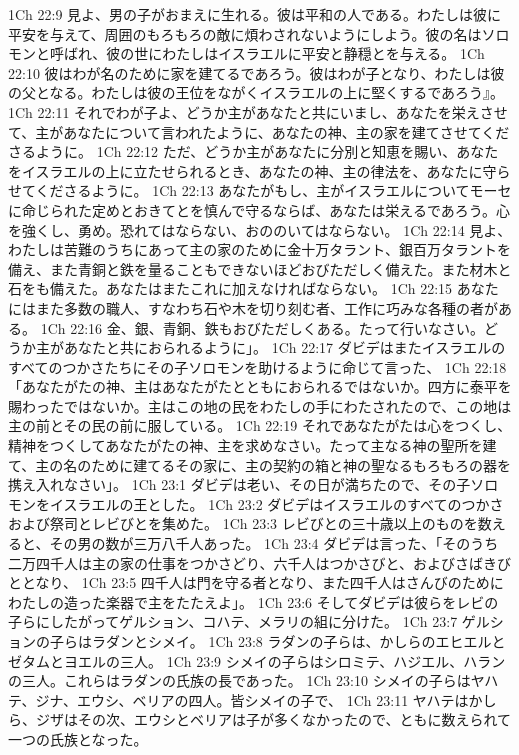1Ch 22:9  見よ、男の子がおまえに生れる。彼は平和の人である。わたしは彼に平安を与えて、周囲のもろもろの敵に煩わされないようにしよう。彼の名はソロモンと呼ばれ、彼の世にわたしはイスラエルに平安と静穏とを与える。
1Ch 22:10  彼はわが名のために家を建てるであろう。彼はわが子となり、わたしは彼の父となる。わたしは彼の王位をながくイスラエルの上に堅くするであろう』。
1Ch 22:11  それでわが子よ、どうか主があなたと共にいまし、あなたを栄えさせて、主があなたについて言われたように、あなたの神、主の家を建てさせてくださるように。
1Ch 22:12  ただ、どうか主があなたに分別と知恵を賜い、あなたをイスラエルの上に立たせられるとき、あなたの神、主の律法を、あなたに守らせてくださるように。
1Ch 22:13  あなたがもし、主がイスラエルについてモーセに命じられた定めとおきてとを慎んで守るならば、あなたは栄えるであろう。心を強くし、勇め。恐れてはならない、おののいてはならない。
1Ch 22:14  見よ、わたしは苦難のうちにあって主の家のために金十万タラント、銀百万タラントを備え、また青銅と鉄を量ることもできないほどおびただしく備えた。また材木と石をも備えた。あなたはまたこれに加えなければならない。
1Ch 22:15  あなたにはまた多数の職人、すなわち石や木を切り刻む者、工作に巧みな各種の者がある。
1Ch 22:16  金、銀、青銅、鉄もおびただしくある。たって行いなさい。どうか主があなたと共におられるように」。
1Ch 22:17  ダビデはまたイスラエルのすべてのつかさたちにその子ソロモンを助けるように命じて言った、
1Ch 22:18  「あなたがたの神、主はあなたがたとともにおられるではないか。四方に泰平を賜わったではないか。主はこの地の民をわたしの手にわたされたので、この地は主の前とその民の前に服している。
1Ch 22:19  それであなたがたは心をつくし、精神をつくしてあなたがたの神、主を求めなさい。たって主なる神の聖所を建て、主の名のために建てるその家に、主の契約の箱と神の聖なるもろもろの器を携え入れなさい」。
1Ch 23:1  ダビデは老い、その日が満ちたので、その子ソロモンをイスラエルの王とした。
1Ch 23:2  ダビデはイスラエルのすべてのつかさおよび祭司とレビびとを集めた。
1Ch 23:3  レビびとの三十歳以上のものを数えると、その男の数が三万八千人あった。
1Ch 23:4  ダビデは言った、「そのうち二万四千人は主の家の仕事をつかさどり、六千人はつかさびと、およびさばきびととなり、
1Ch 23:5  四千人は門を守る者となり、また四千人はさんびのためにわたしの造った楽器で主をたたえよ」。
1Ch 23:6  そしてダビデは彼らをレビの子らにしたがってゲルション、コハテ、メラリの組に分けた。
1Ch 23:7  ゲルションの子らはラダンとシメイ。
1Ch 23:8  ラダンの子らは、かしらのエヒエルとゼタムとヨエルの三人。
1Ch 23:9  シメイの子らはシロミテ、ハジエル、ハランの三人。これらはラダンの氏族の長であった。
1Ch 23:10  シメイの子らはヤハテ、ジナ、エウシ、ベリアの四人。皆シメイの子で、
1Ch 23:11  ヤハテはかしら、ジザはその次、エウシとベリアは子が多くなかったので、ともに数えられて一つの氏族となった。
